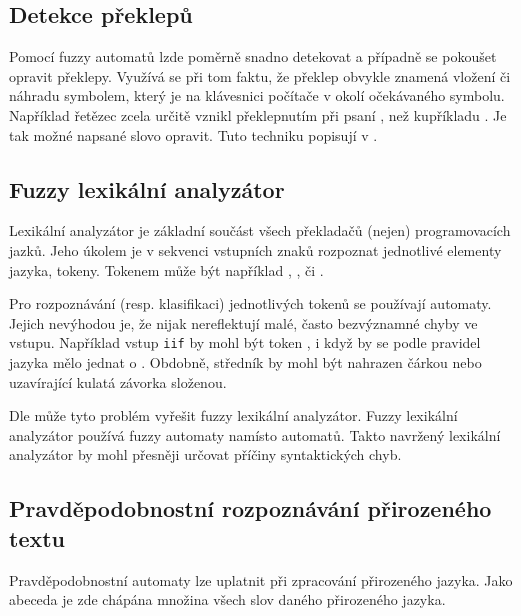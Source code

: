 \subsection{Detekce překlepů} \label{subs:DetTyp}
Pomocí fuzzy automatů lzde poměrně snadno detekovat a případně se pokoušet opravit překlepy. Využívá se při tom faktu, že překlep obvykle znamená vložení či náhradu symbolem, který je na klávesnici počítače v okolí očekávaného symbolu. Například řetězec  zcela určitě vznikl překlepnutím při psaní , než kupříkladu . Je tak možné napsané slovo opravit. Tuto techniku popisují v \cite{AndAbdAsm-ApprPattMatcFuzzLog, SnaKepAbrHas-AproxStriMatchFuzzAut}.


\subsection{Fuzzy lexikální analyzátor}
Lexikální analyzátor je základní součást všech překladačů (nejen) programovacích jazků. Jeho úkolem je v sekvenci vstupních znaků rozpoznat jednotlivé elementy jazyka, tokeny. Tokenem může být například , ,  či .

Pro rozpoznávání (resp. klasifikaci) jednotlivých tokenů se používají  automaty. Jejich nevýhodou je, že nijak nereflektují malé, často bezvýznamné chyby ve vstupu. Například vstup \texttt{iif} by mohl být token , i když by se podle pravidel jazyka mělo jednat o . Obdobně, středník by mohl být nahrazen čárkou nebo uzavírající kulatá závorka složenou. 

Dle \cite{MatSalSalYu-LexAnaSimFinFuzAutMod} může tyto problém vyřešit fuzzy lexikální analyzátor. Fuzzy lexikální analyzátor používá fuzzy automaty namísto  automatů. Takto navržený lexikální analyzátor by mohl přesněji určovat příčiny syntaktických chyb.

\subsection{Pravděpodobnostní rozpoznávání přirozeného textu}
Pravděpodobnostní automaty lze uplatnit při zpracování přirozeného jazyka. Jako abeceda je zde chápána množina všech slov daného přirozeného jazyka. 

